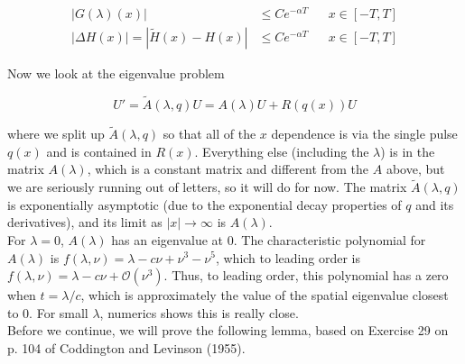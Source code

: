 \documentclass[12pt]{article}
\begin{document}
\begin{align*}
|G(\lambda)(x)| &\leq C e^{-\alpha T} && x \in [-T, T]\\
|\Delta H(x)| = |\tilde{H}(x) - H(x)| &\leq C e^{-\alpha T} && x \in [-T, T]
\end{align*}

Now we look at the eigenvalue problem

\begin{equation}
U' = \tilde{A}(\lambda, q) U = A(\lambda) U + R(q(x)) U
\end{equation}

where we split up $\tilde{A}(\lambda, q)$ so that all of the $x$ dependence is via the single pulse $q(x)$ and is contained in $R(x)$. Everything else (including the $\lambda$) is in the matrix $A(\lambda)$, which is a constant matrix and different from the $A$ above, but we are seriously running out of letters, so it will do for now. The matrix $\tilde{A}(\lambda, q)$ is exponentially asymptotic (due to the exponential decay properties of $q$ and its derivatives), and its limit as $|x| \rightarrow \infty$ is $A(\lambda)$.\\

For $\lambda = 0$, $A(\lambda)$ has an eigenvalue at 0. The characteristic polynomial for $A(\lambda)$ is $f(\lambda, \nu) = \lambda - c \nu + \nu^3 - \nu^5$, which to leading order is $f(\lambda, \nu) = \lambda - c \nu + \mathcal{O}(\nu^3)$. Thus, to leading order, this polynomial has a zero when $t = \lambda / c$, which is approximately the value of the spatial eigenvalue closest to 0. For small $\lambda$, numerics shows this is really close.\\

Before we continue, we will prove the following lemma, based on Exercise 29 on p. 104 of Coddington and Levinson (1955).
\end{document}
